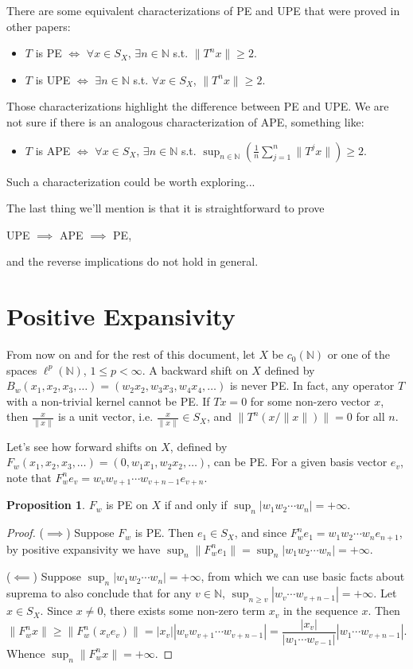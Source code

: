 \documentclass{article}
\theoremstyle{definition}\newtheorem{remark}[theorem]{Remark}
\theoremstyle{definition}\newtheorem{example}[theorem]{Example}
\theoremstyle{definition}\newtheorem{fact}[theorem]{Fact}
\theoremstyle{definition}\newtheorem{diagram}[theorem]{Diagram}
\theoremstyle{definition}\newtheorem{definition}[theorem]{Definition}
\theoremstyle{definition}\newtheorem{question}[theorem]{Question}
\newtheorem{proposition}[theorem]{Proposition}
\newcommand{\N}{\mathbb{N}}
\begin{document}
There are some equivalent characterizations of PE and UPE that were proved in other papers:
\begin{itemize}
    \item $T$ is PE $\iff$ $\forall x\in S_X$, $\exists n\in \N$ s.t. $\|T^n x\|\geq 2$.
    \item $T$ is UPE $\iff$ $\exists n\in \N$ s.t. $\forall x\in S_X$, $\|T^n x\|\geq 2$.
\end{itemize}
Those characterizations highlight the difference between PE and UPE. We are not sure if there is an analogous characterization of APE, something like:
\begin{itemize}
    \item $T$ is APE $\iff$ $\forall x\in S_X$, $\exists n\in \N$ s.t. $\sup_{n\in \N} \left(\frac {1}{n} \sum_{j=1}^n \|T^j x\|\right)\geq 2$.
\end{itemize}
Such a characterization could be worth exploring...

The last thing we'll mention is that it is straightforward to prove 
\begin{center}
    UPE $\implies $ APE $\implies$ PE,
\end{center}
and the reverse implications do not hold in general.

\section{Positive Expansivity}
From now on and for the rest of this document, let $X$ be $c_0(\N)$ or one of the spaces $\ell^p(\N)$, $1\leq p<\infty$. A backward shift on $X$ defined by $B_w(x_1,x_2,x_3,\ldots)=(w_2 x_2, w_3 x_3, w_4 x_4,\ldots)$ is never PE. In fact, any operator $T$ with a non-trivial kernel cannot be PE. If $Tx=0$ for some non-zero vector $x$, then $\frac{x}{\|x\|}$ is a unit vector, i.e. $\frac{x}{\|x\|}\in S_X$, and $\|T^n(x/\|x\|)\|=0$ for all $n$.

Let's see how forward shifts on $X$, defined by $F_w (x_1,x_2,x_3,\ldots)=(0,w_1x_1,w_2x_2,\ldots)$, can be PE. For a given basis vector $e_v$, note that $F_w^n e_v=w_v w_{v+1}\cdots w_{v+n-1} e_{v+n}$.

\begin{proposition}
    $F_w$ is PE on $X$ if and only if $\sup_{n} |w_1 w_2 \cdots w_n|=+\infty$.
\end{proposition}

\begin{proof}
    ($\implies$) Suppose $F_w$ is PE. Then $e_1\in S_X$, and since $F_w^n e_1 = w_1w_2\cdots w_n e_{n+1}$, by positive expansivity we have $\sup_{n} \|F_w^n e_1\|=\sup_n |w_1w_2\cdots w_n|=+\infty$.

    ($\impliedby$) Suppose $\sup_{n} |w_1 w_2 \cdots w_n|=+\infty$, from which we can use basic facts about suprema to also conclude that for any $v\in \N$, $\sup_{n\geq v} |w_v\cdots w_{v+n-1}|=+\infty$. Let $x\in S_X$. Since $x\not = 0$, there exists some non-zero term $x_v$ in the sequence $x$. Then
    \[\|F_w^n x\| \geq \|F_w^n(x_v e_v)\|=|x_v| |w_v w_{v+1}\cdots w_{v+n-1}|=\frac{|x_v|}{|w_1\cdots w_{v-1}|} |w_1\cdots w_{v+n-1}|.\]
    Whence $\sup_n \|F_w^n x\|=+\infty$.
\end{proof}
\end{document}
